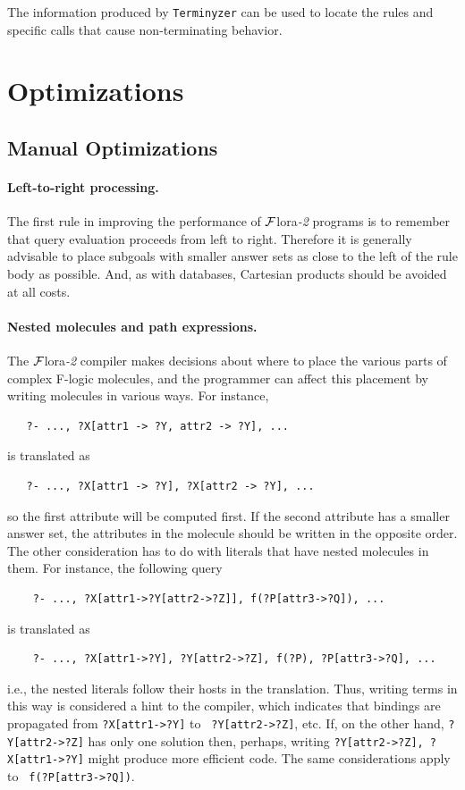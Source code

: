 \documentclass[11pt]{article}
\newcommand{\FLORA}{{\mbox{\sc ${\cal F}${lora}\rm\emph{-2}}}\xspace}
\begin{document}
The information produced by {\tt Terminyzer} can be used to locate
the rules and specific calls that cause
non-terminating behavior.

\section{Optimizations}

\subsection{Manual Optimizations}

\paragraph{Left-to-right processing.}
The first rule in improving the performance of \FLORA programs is to
remember that query evaluation proceeds from left to right. Therefore it is
generally advisable to place subgoals with smaller answer sets as close to
the left of the rule body as possible. And, as with databases, Cartesian
products should be avoided at all costs.

\paragraph{Nested molecules and path expressions.}
The \FLORA compiler makes decisions about
where to place the various parts of complex F-logic molecules, and the
programmer can affect this placement by writing molecules in various ways.
For instance,
\begin{verbatim}
   ?- ..., ?X[attr1 -> ?Y, attr2 -> ?Y], ...
\end{verbatim}
is translated as
\begin{verbatim}
   ?- ..., ?X[attr1 -> ?Y], ?X[attr2 -> ?Y], ...  
\end{verbatim}
so the first attribute will be computed first. If the second attribute has
a smaller answer set, the attributes in the molecule should be written in
the opposite order. The other consideration has to do with literals that
have nested molecules in them. For instance, the following query
\begin{verbatim}
    ?- ..., ?X[attr1->?Y[attr2->?Z]], f(?P[attr3->?Q]), ...
\end{verbatim}
is translated as
\begin{verbatim}
    ?- ..., ?X[attr1->?Y], ?Y[attr2->?Z], f(?P), ?P[attr3->?Q], ...
\end{verbatim}
i.e., the nested literals follow their hosts in the translation.
Thus, writing terms in this way is considered a hint to the compiler, which
indicates that bindings are propagated from {\tt ?X[attr1->?Y]} to {\tt
  ?Y[attr2->?Z]}, etc. If, on the other hand, {\tt ?Y[attr2->?Z]} has only one
solution then, perhaps, writing {\tt ?Y[attr2->?Z], ?X[attr1->?Y]} might
produce more efficient code.  The same considerations apply to {\tt
  f(?P[attr3->?Q])}.
\end{document}
